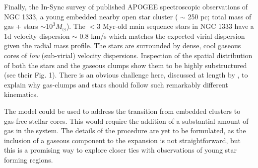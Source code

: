 Finally, the In-Sync survey of \cite{Foster2015} published APOGEE spectroscopic observations of NGC 1333, a young embedded nearby open star cluster ( $\sim$ 250 pc; total mass of gas + stars $\sim10^3 M_\odot$). The $< 3 $ Myr-old main sequence stars in NGC 1333 have a 1d velocity dispersion $\sim$ 0.8 km/s which matches the expected virial dispersion given the radial mass profile. The stars are surrounded by dense, cool gaseous cores of {\it low} (sub-virial) velocity dispersions. Inspection of the spatial distribution of both the stars and the gaseous clumps show them to be highly substructured (see their Fig. 1). There is an obvious challenge here, discussed at length by \citeauthor{Foster2015}, to explain why gas-clumps and stars should follow such remarkably different kinematics.

The \HubLem model could be used to address the transition from embedded clusters to gas-free stellar cores. This would require the addition of  a substantial amount of gas in the system. The details of the procedure are yet to be formulated, as the inclusion of a gaseous component to the expansion is not straightforward, but this is a promising way to explore closer ties with observations of young star forming regions.